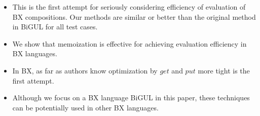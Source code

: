 \begin{itemize}
\item This is the first attempt for seriously considering efficiency of evaluation of BX compositions. Our methods are similar or better than the original method in BiGUL for all test cases.
\item We show that memoization is effective for achieving evaluation efficiency in BX languages.
\item In BX, as far as authors know optimization by $get$ and $put$ more tight is the first attempt. 
\item Although we focus on a BX language BiGUL in this paper, these techniques can be potentially used in other BX languages. 
\end{itemize}

